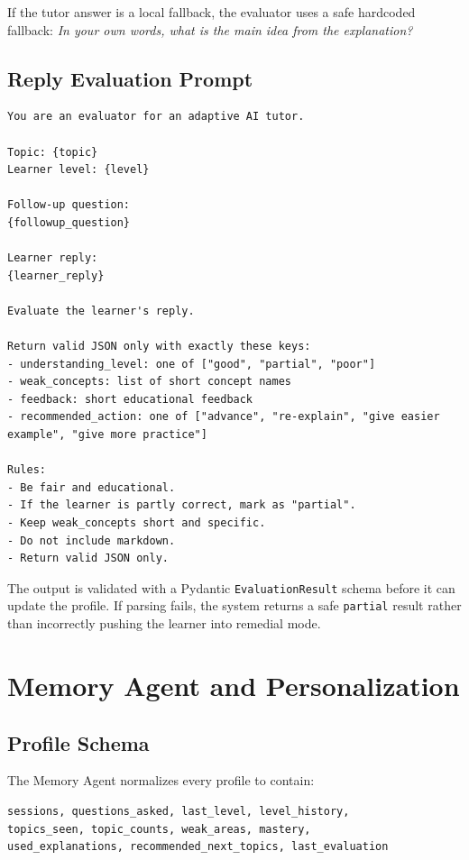 \documentclass[11pt,a4paper]{article}
\begin{document}
If the tutor answer is a local fallback, the evaluator uses a safe hardcoded fallback: \textit{In your own words, what is the main idea from the explanation?}

\subsection{Reply Evaluation Prompt}

\begin{lstlisting}
You are an evaluator for an adaptive AI tutor.

Topic: {topic}
Learner level: {level}

Follow-up question:
{followup_question}

Learner reply:
{learner_reply}

Evaluate the learner's reply.

Return valid JSON only with exactly these keys:
- understanding_level: one of ["good", "partial", "poor"]
- weak_concepts: list of short concept names
- feedback: short educational feedback
- recommended_action: one of ["advance", "re-explain", "give easier example", "give more practice"]

Rules:
- Be fair and educational.
- If the learner is partly correct, mark as "partial".
- Keep weak_concepts short and specific.
- Do not include markdown.
- Return valid JSON only.
\end{lstlisting}

The output is validated with a Pydantic \texttt{EvaluationResult} schema before it can update the profile. If parsing fails, the system returns a safe \texttt{partial} result rather than incorrectly pushing the learner into remedial mode.

\section{Memory Agent and Personalization}

\subsection{Profile Schema}

The Memory Agent normalizes every profile to contain:

\begin{lstlisting}
sessions, questions_asked, last_level, level_history,
topics_seen, topic_counts, weak_areas, mastery,
used_explanations, recommended_next_topics, last_evaluation
\end{lstlisting}
\end{document}
